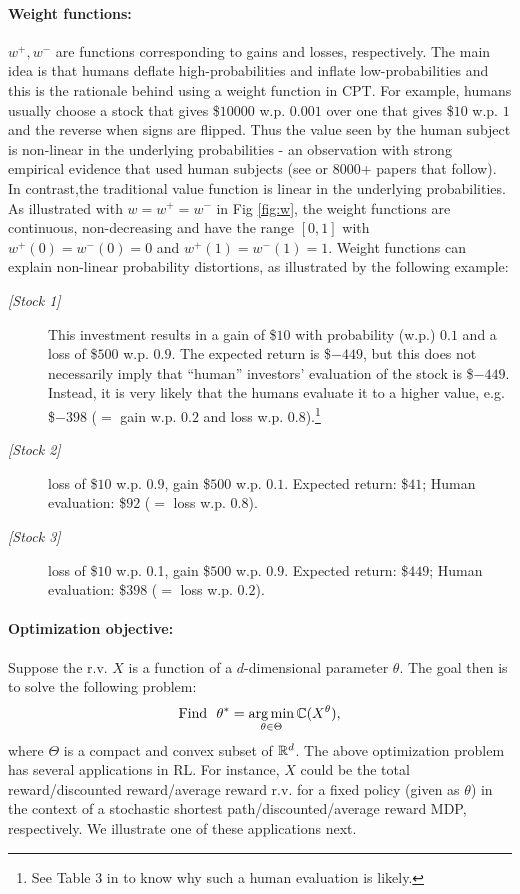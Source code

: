 \documentclass[11pt,letterpaper,english]{article}
\begin{document}
\paragraph{Weight functions:} $w^+, w^-$ are functions corresponding to gains and losses, respectively. 
The main idea is that humans deflate high-probabilities and inflate low-probabilities and this is the rationale behind using a weight function in CPT.
For example, humans usually choose a stock that gives \$$10000$ w.p. $0.001$ over one that gives \$$10$ w.p. $1$ and the reverse when signs are flipped. 
Thus the value seen by the human subject is non-linear in the underlying probabilities - an observation with strong empirical evidence that used human subjects (see \cite{tversky1992advances} or $8000$+ papers that follow).  In contrast,the traditional value function is linear in the underlying probabilities. 
As illustrated with $w=w^+=w^-$ in Fig \ref{fig:w}, the weight functions are continuous, non-decreasing and have the range $[0,1]$ with $w^+(0)=w^-(0)=0$ and $w^+(1)=w^-(1)=1$. Weight functions can explain non-linear probability distortions, as illustrated by the following example: 
\begin{description}
 \item[\textit{[Stock 1]}] This investment results in a gain of \$$10$ with probability (w.p.) $0.1$ and a loss of \$$500$ w.p. $0.9$. The expected return is \$$-449$, but this does not necessarily imply that ``human'' investors' evaluation of the stock is \$$-449$. Instead, it is very likely that the humans evaluate it to a higher value, e.g. \$$-398$ ($=$ gain w.p. $0.2$ and loss w.p. $0.8$).\footnote{See Table 3 in \cite{tversky1992advances} to know why such a human evaluation is likely.}
\item[\textit{[Stock 2]}] loss of \$$10$ w.p. $0.9$, gain \$$500$ w.p. $0.1$. Expected return: \$$41$; Human evaluation: \$$92$ ($=$ loss w.p. $0.8$).
\item[\textit{[Stock 3]}] loss of \$$10$ w.p. 0.1, gain \$$500$ w.p. $0.9$. Expected return: \$$449$; Human evaluation: \$$398$ ($=$ loss w.p. $0.2$). 
\end{description}

\paragraph{Optimization objective:} Suppose the r.v. $X$ is a function of a $d$-dimensional parameter $\theta$. The goal then is to solve the following problem:
\begin{align}
\label{eq:opt-general}
\textrm{Find ~}\theta^* = \mathop{\rm arg\,min}_{\theta \in \Theta} \mathbb{C}(X^\theta),
\end{align}
where $\Theta$ is a compact and convex subset of $\mathbb{R}^d$.
The above optimization problem has several applications in RL. For instance, $X$ could be the total reward/discounted reward/average reward r.v. for a fixed policy (given as $\theta$) in the context of a stochastic shortest path/discounted/average reward MDP, respectively. We illustrate one of these applications next.
\end{document}
